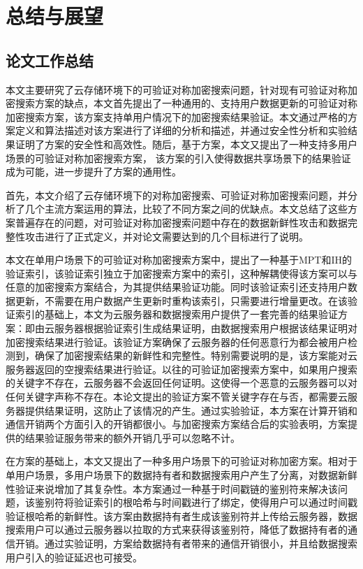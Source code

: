 \chapter{总结与展望}
\label{cha:conclusion}
\section{论文工作总结}
本文主要研究了云存储环境下的可验证对称加密搜索问题，针对现有可验证对称加密搜索方案的缺点，本文首先提出了一种通用的、支持用户数据更新的可验证对称加密搜索方案\single，该方案支持单用户情况下的加密搜索结果验证。本文通过严格的方案定义和算法描述对该方案进行了详细的分析和描述，并通过安全性分析和实验结果证明了\single 方案的安全性和高效性。随后，基于\single 方案，本文又提出了一种支持多用户场景的可验证对称加密搜索方案\multi ， 该方案的引入使得数据共享场景下的结果验证成为可能，进一步提升了方案的通用性。

首先，本文介绍了云存储环境下的对称加密搜索、可验证对称加密搜索问题，并分析了几个主流方案运用的算法，比较了不同方案之间的优缺点。本文总结了这些方案普遍存在的问题，对可验证对称加密搜索问题中存在的数据新鲜性攻击和数据完整性攻击进行了正式定义，并对论文需要达到的几个目标进行了说明。

本文在单用户场景下的可验证对称加密搜索方案\single 中，提出了一种基于MPT和IH的验证索引，该验证索引独立于加密搜索方案中的索引，这种解耦使得该方案可以与任意的加密搜索方案结合，为其提供结果验证功能。同时该验证索引还支持用户数据更新，不需要在用户数据产生更新时重构该索引，只需要进行增量更改。在该验证索引的基础上，本文为云服务器和数据搜索用户提供了一套完善的结果验证方案：即由云服务器根据验证索引生成结果证明，由数据搜索用户根据该结果证明对加密搜索结果进行验证。该验证方案确保了云服务器的任何恶意行为都会被用户检测到，确保了加密搜索结果的新鲜性和完整性。特别需要说明的是，该方案能对云服务器返回的空搜索结果进行验证。以往的可验证加密搜索方案中，如果用户搜索的关键字不存在，云服务器不会返回任何证明。这使得一个恶意的云服务器可以对任何关键字声称不存在。本论文提出的验证方案不管关键字存在与否，都需要云服务器提供结果证明，这防止了该情况的产生。通过实验验证，本方案在计算开销和通信开销两个方面引入的开销都很小。与加密搜索方案结合后的实验表明，\single 方案提供的结果验证服务带来的额外开销几乎可以忽略不计。

在\single 方案的基础上，本文又提出了一种多用户场景下的可验证对称加密方案\multi 。相对于单用户场景，多用户场景下的数据持有者和数据搜索用户产生了分离，对数据新鲜性验证来说增加了其复杂性。本方案通过一种基于时间戳链的鉴别符来解决该问题，该鉴别符将验证索引的根哈希与时间戳进行了绑定，使得用户可以通过时间戳验证根哈希的新鲜性。该方案由数据持有者生成该鉴别符并上传给云服务器，数据搜索用户可以通过云服务器以拉取的方式来获得该鉴别符，降低了数据持有者的通信开销。通过实验证明，\multi 方案给数据持有者带来的通信开销很小，并且给数据搜索用户引入的验证延迟也可接受。

